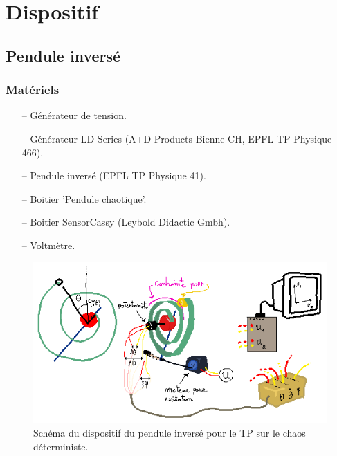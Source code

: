 \documentclass[a4paper,12pt,oneside]{article}
\begin{document}
\section{Dispositif}
\subsection{Pendule inversé}

\subsubsection{Matériels}
\begin{itemize}
  \item[--] Générateur de tension.
  \item[--] Générateur LD Series (A+D Products Bienne CH, EPFL TP Physique 466).
  \item[--] Pendule inversé (EPFL TP Physique 41).
  \item[--] Boitier ’Pendule chaotique’.
  \item[--] Boitier SensorCassy (Leybold Didactic Gmbh).
  \item[--] Voltmètre.
\end{itemize}


\begin{figure}[h!]
  \begin{center}
  \includegraphics[width=1\linewidth,angle=0]{./figures/pendule.png}
  \caption{Schéma du dispositif du pendule inversé pour le TP sur le chaos déterministe.} \label{fig:pendule1}
  \end{center}
\end{figure}
\end{document}
